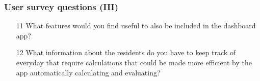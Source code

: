 \documentclass{beamer}
\begin{document}
\begin{frame}
  \frametitle{User survey questions (III)}
  \begin{enumerate}
    \item[11] What features would you find useful to also be included in the dashboard app?
    \item[12]  What information about the residents do you have to keep track of everyday that require calculations that could be made more efficient by the app automatically calculating and evaluating?
  \end{enumerate}
\end{frame}
\end{document}
